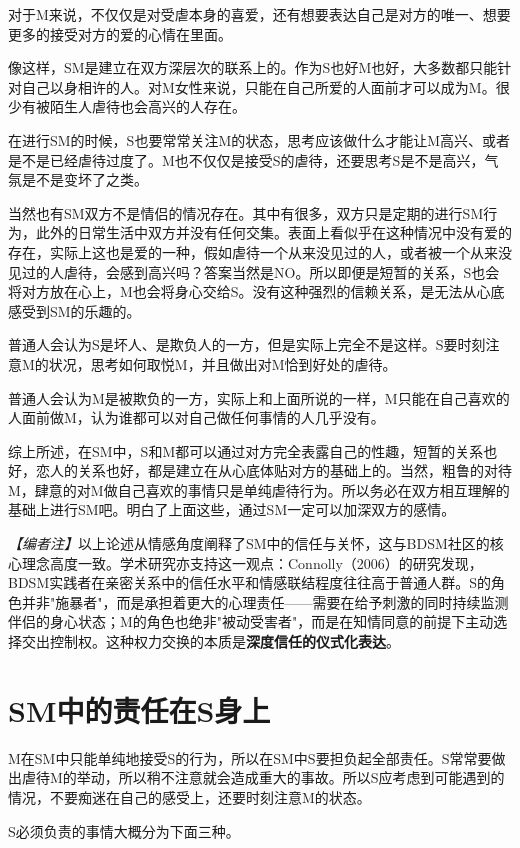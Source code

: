 \documentclass[12pt,UTF8]{ctexbook}
\begin{document}
对于M来说，不仅仅是对受虐本身的喜爱，还有想要表达自己是对方的唯一、想要更多的接受对方的爱的心情在里面。

像这样，SM是建立在双方深层次的联系上的。作为S也好M也好，大多数都只能针对自己以身相许的人。对M女性来说，只能在自己所爱的人面前才可以成为M。很少有被陌生人虐待也会高兴的人存在。

在进行SM的时候，S也要常常关注M的状态，思考应该做什么才能让M高兴、或者是不是已经虐待过度了。M也不仅仅是接受S的虐待，还要思考S是不是高兴，气氛是不是变坏了之类。

当然也有SM双方不是情侣的情况存在。其中有很多，双方只是定期的进行SM行为，此外的日常生活中双方并没有任何交集。表面上看似乎在这种情况中没有爱的存在，实际上这也是爱的一种，假如虐待一个从来没见过的人，或者被一个从来没见过的人虐待，会感到高兴吗？答案当然是NO。所以即便是短暂的关系，S也会将对方放在心上，M也会将身心交给S。没有这种强烈的信赖关系，是无法从心底感受到SM的乐趣的。

普通人会认为S是坏人、是欺负人的一方，但是实际上完全不是这样。S要时刻注意M的状况，思考如何取悦M，并且做出对M恰到好处的虐待。

普通人会认为M是被欺负的一方，实际上和上面所说的一样，M只能在自己喜欢的人面前做M，认为谁都可以对自己做任何事情的人几乎没有。

综上所述，在SM中，S和M都可以通过对方完全表露自己的性趣，短暂的关系也好，恋人的关系也好，都是建立在从心底体贴对方的基础上的。当然，粗鲁的对待M，肆意的对M做自己喜欢的事情只是单纯虐待行为。所以务必在双方相互理解的基础上进行SM吧。明白了上面这些，通过SM一定可以加深双方的感情。

\textit{【编者注】}以上论述从情感角度阐释了SM中的信任与关怀，这与BDSM社区的核心理念高度一致。学术研究亦支持这一观点：Connolly（2006）的研究发现，BDSM实践者在亲密关系中的信任水平和情感联结程度往往高于普通人群。S的角色并非"施暴者"，而是承担着更大的心理责任——需要在给予刺激的同时持续监测伴侣的身心状态；M的角色也绝非"被动受害者"，而是在知情同意的前提下主动选择交出控制权。这种权力交换的本质是\textbf{深度信任的仪式化表达}。

\section{SM中的责任在S身上}

M在SM中只能单纯地接受S的行为，所以在SM中S要担负起全部责任。S常常要做出虐待M的举动，所以稍不注意就会造成重大的事故。所以S应考虑到可能遇到的情况，不要痴迷在自己的感受上，还要时刻注意M的状态。

S必须负责的事情大概分为下面三种。
\end{document}
